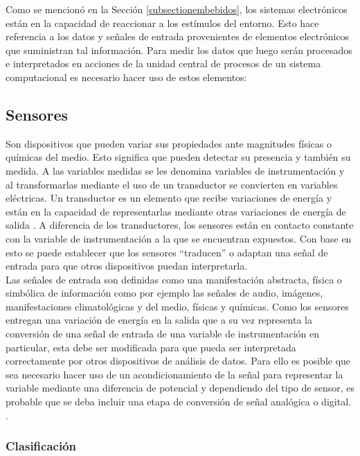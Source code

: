 % 
% 
% 

Como se mencionó en la Sección \ref{subsectionembebidos}, los sistemas electrónicos están en la capacidad de reaccionar a los estímulos del entorno. Esto hace referencia a los datos y señales de entrada provenientes de elementos electrónicos que suministran tal información. Para medir los datos que luego serán procesados e interpretados en acciones de la unidad central de procesos de un sistema computacional es necesario hacer uso de estos elementos:

\subsection{Sensores}

Son dispositivos que pueden variar sus propiedades ante magnitudes físicas o químicas del medio. Esto significa que pueden detectar su presencia y también su medida. A las variables medidas se les denomina variables de instrumentación y al transformarlas mediante el uso de un transductor se convierten en variables eléctricas. Un transductor es un elemento que recibe variaciones de energía y están en la capacidad de representarlas mediante otras variaciones de energía de salida \cite{instrum}. A diferencia de los transductores, los sensores están en contacto constante con la variable de instrumentación a la que se encuentran expuestos. Con base en esto se puede establecer que los sensores ``traducen''  o adaptan una señal de entrada para que otros dispositivos puedan interpretarla.\\


Las señales de entrada son definidas como una manifestación abstracta, física o simbólica de información como por ejemplo las señales de audio, imágenes, manifestaciones climatológicas y del medio, físicas y químicas. Como los sensores entregan una variación de energía en la salida que a su vez representa la conversión de una señal de entrada de una variable de instrumentación en particular, esta debe ser modificada para que pueda ser interpretada correctamente por otros dispositivos de análisis de datos. Para ello es posible que sea necesario hacer uso de un acondicionamiento de la señal para representar la variable mediante una diferencia de potencial y dependiendo del tipo de sensor, es probable que se deba incluir una etapa de conversión de señal analógica o digital. \cite{instrum}.

\subsubsection{Clasificación}

